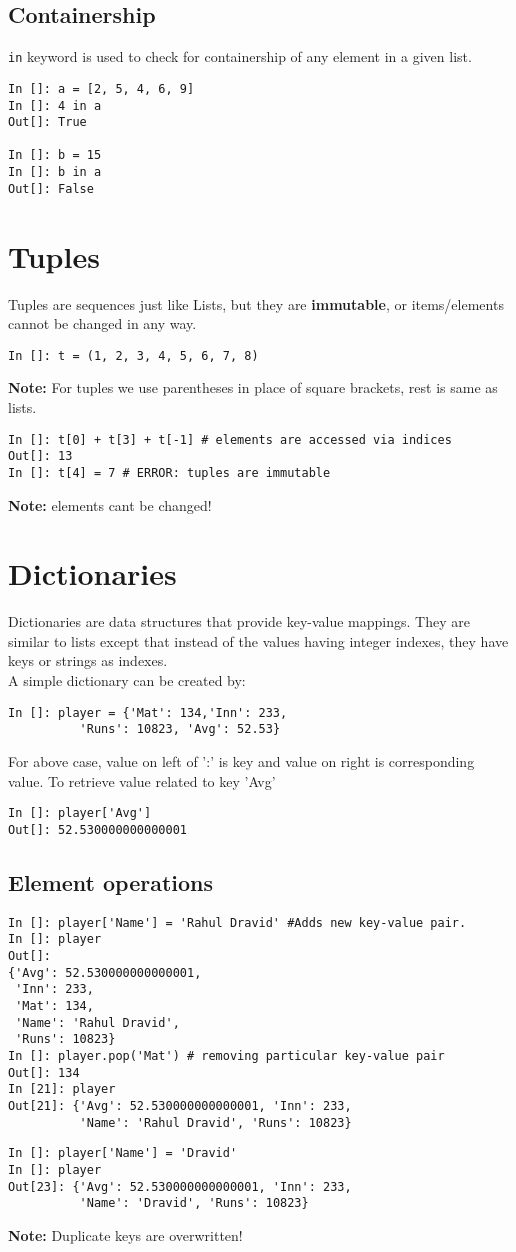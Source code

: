 \documentclass[12pt]{article}
\newcommand{\typ}[1]{\lstinline{#1}}
\begin{document}
\subsection{Containership}
\typ{in} keyword is used to check for containership of any element in a given list.
\begin{lstlisting}
In []: a = [2, 5, 4, 6, 9]
In []: 4 in a
Out[]: True

In []: b = 15
In []: b in a
Out[]: False
\end{lstlisting}
\section{Tuples}
Tuples are sequences just like Lists, but they are \textbf{immutable}, or items/elements cannot be changed in any way.
\begin{lstlisting}
In []: t = (1, 2, 3, 4, 5, 6, 7, 8) 
\end{lstlisting}
\textbf{Note:} For tuples we use parentheses in place of square brackets, rest is same as lists.
\begin{lstlisting}
In []: t[0] + t[3] + t[-1] # elements are accessed via indices
Out[]: 13
In []: t[4] = 7 # ERROR: tuples are immutable
\end{lstlisting}
\textbf{Note:} elements cant be changed!
\section{Dictionaries}
Dictionaries are data structures that provide key-value mappings. They are similar to lists except that instead of the values having integer indexes, they have keys or strings as indexes.\\
A simple dictionary can be created by:
\begin{lstlisting}
In []: player = {'Mat': 134,'Inn': 233,
          'Runs': 10823, 'Avg': 52.53}
\end{lstlisting}
For above case, value on left of ':' is key and value on right is corresponding value. To retrieve value related to key 'Avg'
\begin{lstlisting}
In []: player['Avg']
Out[]: 52.530000000000001
\end{lstlisting}
\subsection{Element operations}
\begin{lstlisting}
In []: player['Name'] = 'Rahul Dravid' #Adds new key-value pair.
In []: player
Out[]: 
{'Avg': 52.530000000000001,
 'Inn': 233,
 'Mat': 134,
 'Name': 'Rahul Dravid',
 'Runs': 10823}
In []: player.pop('Mat') # removing particular key-value pair
Out[]: 134
In [21]: player
Out[21]: {'Avg': 52.530000000000001, 'Inn': 233, 
          'Name': 'Rahul Dravid', 'Runs': 10823}
\end{lstlisting}
\begin{lstlisting}
In []: player['Name'] = 'Dravid'
In []: player
Out[23]: {'Avg': 52.530000000000001, 'Inn': 233, 
          'Name': 'Dravid', 'Runs': 10823}
\end{lstlisting}
\textbf{Note:} Duplicate keys are overwritten!
\end{document}
